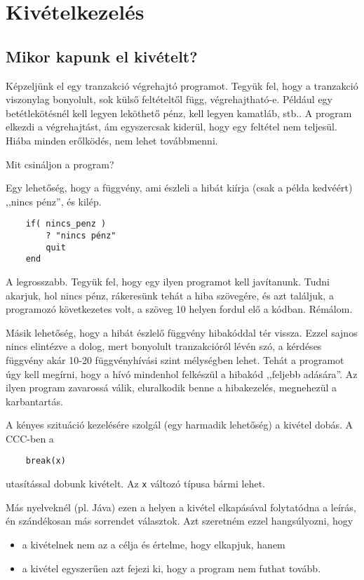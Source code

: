 
\section{Kivételkezelés}

\subsection{Mikor kapunk el  kivételt?}

Képzeljünk el egy tranzakció végrehajtó programot. 
Tegyük fel, hogy a tranzakció viszonylag bonyolult, 
sok külső feltételtől függ, végrehajtható-e.
Például egy betétlekötésnél kell legyen leköthető pénz,
kell legyen kamatláb, stb..
A program elkezdi a végrehajtást, ám egyszercsak kiderül,
hogy egy feltétel nem teljesül. Hiába minden erőlködés, 
nem lehet továbbmenni.

Mit csináljon a program? 

Egy lehetőség, hogy a függvény, ami észleli a hibát kiírja 
(csak a példa kedvéért) ,,nincs pénz'', és kilép. 
\begin{verbatim}
    if( nincs_penz )
        ? "nincs pénz"
        quit
    end
\end{verbatim}
A legrosszabb. Tegyük fel, hogy egy ilyen programot kell javítanunk. 
Tudni akarjuk, hol nincs pénz, rákeresünk tehát a hiba szövegére,
és azt találjuk, a programozó következetes volt, a szöveg 10 helyen fordul 
elő a kódban. Rémálom.

Másik lehetőség, hogy a hibát észlelő függvény hibakóddal tér vissza. 
Ezzel sajnos nincs elintézve a dolog, mert bonyolult tranzakcióról lévén szó,
a kérdéses függvény akár 10-20 függvényhívási szint mélységben lehet. Tehát
a programot úgy kell megírni, hogy a hívó mindenhol felkészül a
hibakód ,,feljebb adására''. Az ilyen program zavarossá válik,
eluralkodik benne a hibakezelés, megnehezül a karbantartás.

A kényes szituáció kezelésére szolgál (egy harmadik lehetőség) a kivétel dobás. 
A CCC-ben a
\begin{verbatim}
    break(x)
\end{verbatim}
utasítással dobunk kivételt. Az \verb!x! változó típusa bármi lehet.


Más nyelveknél (pl. Jáva) ezen a helyen a kivétel elkapásával folytatódna a leírás,
én szándékosan más sorrendet választok. Azt szeretném ezzel hangsúlyozni, hogy
\begin{itemize}
 \item a kivételnek nem az a célja és értelme, hogy elkapjuk, hanem
 \item a kivétel egyszerűen azt fejezi ki, hogy a program nem futhat tovább.
\end{itemize}

